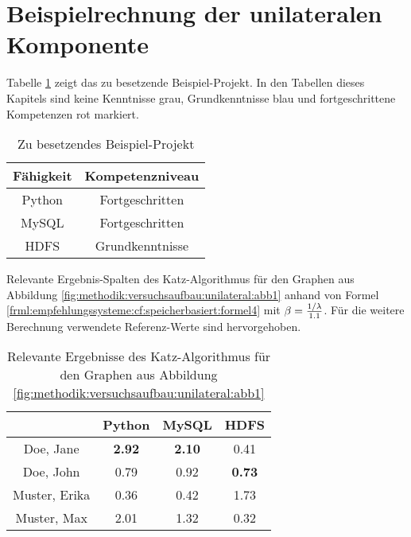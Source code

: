 \section{Beispielrechnung der unilateralen Komponente}
\label{ch:nebenrechnungen:unilateral}
Tabelle \ref{tbl:berechnungDerKatzZentralitaetPseudoMitarbeiter:tbl1} zeigt das zu besetzende Beispiel-Projekt. In den Tabellen dieses Kapitels sind keine Kenntnisse grau, Grundkenntnisse blau und fortgeschrittene Kompetenzen rot markiert.
\begin{table}[h]
	\centering
	\begin{tabular}{c|c}
		Fähigkeit & Kompetenzniveau \\
		\hline
		Python  & \cellcolor{usercolor}Fortgeschritten\\
		MySQL   & \cellcolor{usercolor}Fortgeschritten\\
		HDFS    & \cellcolor{itemcolor}Grundkenntnisse
	\end{tabular}
	\caption{Zu besetzendes Beispiel-Projekt}
	\label{tbl:berechnungDerKatzZentralitaetPseudoMitarbeiter:tbl1}
\end{table}

Relevante Ergebnis-Spalten des Katz-Algorithmus für den Graphen aus Abbildung \ref{fig:methodik:versuchsaufbau:unilateral:abb1} anhand von Formel \ref{frml:empfehlungssysteme:cf:speicherbasiert:formel4} mit $\beta = \frac{1/\lambda}{1.1}$. Für die weitere Berechnung verwendete Referenz-Werte sind hervorgehoben.

\begin{table}[h]
	\centering
	\begin{tabular}{c|c|c|c}
		& Python & MySQL & HDFS\\ 
		\hline
		Doe, Jane     & \cellcolor{usercolor}\textbf{2.92} & \cellcolor{itemcolor}\textbf{2.10} & \cellcolor{exxetagray}0.41\\
		Doe, John     & \cellcolor{exxetagray}0.79 & \cellcolor{itemcolor}0.92 & \cellcolor{itemcolor}\textbf{0.73}\\
		Muster, Erika & \cellcolor{exxetagray}0.36 & \cellcolor{exxetagray}0.42 & \cellcolor{usercolor}1.73\\
		Muster, Max   & \cellcolor{itemcolor}2.01 & \cellcolor{itemcolor}1.32 & \cellcolor{exxetagray}0.32
	\end{tabular}
	\caption{Relevante Ergebnisse des Katz-Algorithmus für den Graphen aus Abbildung \ref{fig:methodik:versuchsaufbau:unilateral:abb1}}
	\label{tbl:berechnungDerKatzZentralitaetPseudoMitarbeiter:tbl2}
\end{table}

